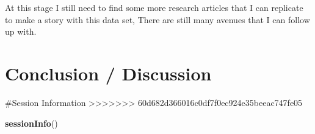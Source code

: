 \documentclass[
]{article}
\newenvironment{Shaded}{\begin{snugshade}}{\end{snugshade}}
\newcommand{\FunctionTok}[1]{\textcolor[rgb]{0.13,0.29,0.53}{\textbf{#1}}}
\newcommand{\NormalTok}[1]{#1}
\begin{document}
At this stage I still need to find some more research articles that I can replicate to make a story with this data set, There are still many avenues that I can follow up with.

\section{Conclusion / Discussion}\label{conclusion-discussion}

\newpage

\#Session Information
>>>>>>> 60d682d366016c0df7f0ec924e35beeac747fe05

\begin{Shaded}
\begin{Highlighting}[]
\FunctionTok{sessionInfo}\NormalTok{()}
\end{Highlighting}
\end{Shaded}
\end{document}
